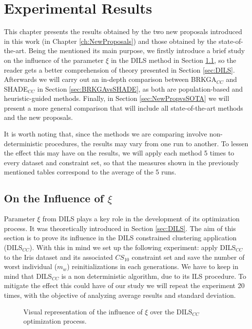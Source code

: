 \chapter{Experimental Results} \label{ch:ExperimentalResults}

This chapter presents the results obtained by the two new proposals introduced in this work (in Chapter \ref{ch:NewProposals}) and those obtained by the state-of-the-art. Being the mentioned its main purpose, we firstly introduce a brief study on the influence of the parameter $\xi$ in the \acs{DILS} method in Section \ref{sec:XiInfl}, so the reader gets a better comprehension of theory presented in Section \ref{sec:DILS}. Afterwards we will carry out an in-depth comparison between \acs{BRKGA}$_{CC}$ and \acs{SHADE}$_{CC}$ in Section \ref{sec:BRKGAvsSHADE}, as both are population-based and heuristic-guided methods. Finally, in Section \ref{sec:NewPropvsSOTA}  we will present a more general comparison that will include all state-of-the-art methods and the new proposals.

It is worth noting that, since the methods we are comparing involve non-deterministic procedures, the results may vary from one run to another. To lessen the effect this may have on the results, we will apply each method 5 times to every dataset and constraint set, so that the measures shown in the previously mentioned tables correspond to the average of the 5 runs.

\section{On the Influence of $\xi$} \label{sec:XiInfl}

Parameter $\xi$ from \acs{DILS} plays a key role in the development of its optimization process. It was theoretically introduced in Section \ref{sec:DILS}. The aim of this section is to prove its influence in the \acs{DILS} constrained clustering application (\acs{DILS}$_{CC}$). With this in mind we set up the following experiment: apply \acs{DILS}$_{CC}$ to the Iris dataset and its associated $CS_{10}$ constraint set and save the number of worst individual ($m_w$) reinitializations in each generations. We have to keep in mind that \acs{DILS}$_{CC}$ is a non deterministic algorithm, due to its \acf{ILS} procedure. To mitigate the effect this could have of our study we will repeat the experiment 20 times, with the objective of analyzing average results and standard deviation.

\begin{figure}[bth]
	\myfloatalign
	\hspace{1cm}
	\caption[Visual representation of the influence of $\xi$ over the DILS$_{CC}$ optimization process.]{Visual representation of the influence of $\xi$ over the \acs{DILS}$_{CC}$ optimization process.}
	\label{fig:RestartsLines}
\end{figure}

